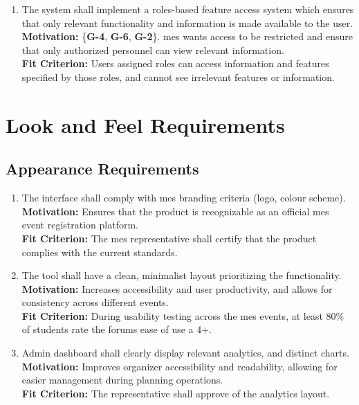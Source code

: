 \documentclass[12pt]{article}
\begin{document}
\begin{enumerate}[align=left,
  leftmargin=*,
  labelsep=1em,
  itemindent=0em,
  label=\bfseries FR-\arabic*:,
  ref=\bfseries FR-\arabic*]
    once an event has completed.\\[2mm]
  {\bf Motivation:} \{\textbf{G-5}, \textbf{G-4}, \textbf{G-3}\}. See \ref{FR9}.\\
  {\bf Fit Criterion:} See \ref{FR9}.
  \item \label{FR11} The system shall implement a roles-based feature access system which ensures that only relevant
    functionality and information is made available to the user.\\[2mm]
    {\bf Motivation:} \{{\bf G-4}, {\bf G-6}, {\bf G-2}\}. \Gls{mes} wants access to be restricted and ensure that
    only authorized personnel can view relevant information.\\
    {\bf Fit Criterion:} Users assigned roles can access information and features specified by those roles, and cannot
    see irrelevant features or information.
\end{enumerate}

\section{Look and Feel Requirements}
\subsection{Appearance Requirements}
\begin{enumerate}[label=LFR-AP.\arabic*, wide=0pt, leftmargin=*]
  \item \label{LFAR1} The interface shall comply with \gls{mes} branding criteria (logo, colour scheme).\\[2mm]
    {\bf Motivation:} Ensures that the product is recognizable as an official \gls{mes} event registration platform.\\
    {\bf Fit Criterion:} The \gls{mes} representative shall certify that the product complies with the current standards.
  \item \label{LFAR2} The tool shall have a clean, minimalist layout prioritizing the functionality.\\[2mm]
    {\bf Motivation:} Increases accessibility and user productivity, and allows for consistency across different events.\\
    {\bf Fit Criterion:} During usability testing across the \gls{mes} events, at least 80\% of students rate the forums ease of use a 4+.
  \item \label{LFAR3} Admin dashboard shall clearly display relevant analytics, and distinct charts.\\[2mm]
    {\bf Motivation:} Improves organizer accessibility and readability, allowing for easier management during planning operations.\\
    {\bf Fit Criterion:} The representative shall approve of the analytics layout.
\end{enumerate}
\end{document}
